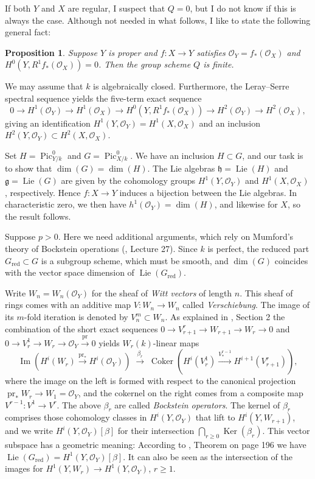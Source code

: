 \documentclass[oneside, 12pt]{amsart}
\newcommand\mylabel[1]{\label{#1}\marginpar{\vspace{-1ex}\medskip\medskip\footnotesize \tt #1}}
\renewcommand\mylabel[1]{\label{#1}}
\newtheorem{proposition}[theorem]{Proposition}
\theoremstyle{definition}
\theoremstyle{remark}
\newcommand{\Cokernel}{\operatorname{Coker}}
\newcommand{\Image}{\operatorname{Im}}
\newcommand{\Kernel}{\operatorname{Ker}}
\newcommand{\Lie}{\operatorname{Lie}}
\newcommand{\lra}{\longrightarrow}
\renewcommand{\O}{\mathscr{O}}
\newcommand{\Pic}{\operatorname{Pic}}
\newcommand{\pr}{\operatorname{pr}}
\newcommand{\ra}{\rightarrow}
\newcommand{\red}{{\operatorname{red}}}
\newcommand{\lieg}{\mathfrak{g}}
\newcommand{\lieh}{\mathfrak{h}}
\begin{document}
\medskip
If both $Y$ and $X$ are regular, I suspect that $Q=0$, but I do not know if this is always the case.
Although not needed in what follows, I like to state the following general fact:

\begin{proposition}
\mylabel{proper monomorphism}
Suppose $Y$ is proper and  $f:X\ra Y$ satisfies $\O_Y=f_*(\O_X)$ and $H^0(Y,R^1f_*(\O_X))=0$. Then  the group scheme  $Q$ is finite.
\end{proposition}

\proof
We may assume that $k$ is algebraically closed. Furthermore, the 
Leray--Serre spectral sequence yields the five-term exact sequence
\begin{equation}
\label{five term sequence}
0\ra H^1(\O_Y)\ra H^1(\O_X)\ra H^0(Y,R^1f_*(\O_X))\ra H^2(\O_Y)\ra H^2(\O_X),
\end{equation}
giving an identification $H^1(Y,\O_Y)=H^1(X,\O_X)$ and an inclusion $H^2(Y,\O_Y)\subset H^2(X,\O_X)$. 

Set $H=\Pic^0_{Y/k}$ and $G=\Pic^0_{X/k}$. We have an inclusion $H\subset G$, and our task is to show that $\dim(G)=\dim(H)$.
The  Lie algebras $\lieh=\Lie(H)$ and $\lieg=\Lie(G)$ are given by the   cohomology groups $H^1(Y,\O_Y)$ and $H^1(X,\O_X)$, respectively.
Hence $f:X\ra Y$ induces a bijection between the Lie algebras.
In characteristic zero,    we then have $h^1(\O_Y)=\dim(H)$, and likewise for $X$, so the result follows.

Suppose   $p>0$. Here we need additional arguments, which rely on  Mumford's  theory of Bockstein operations (\cite{Mumford 1966}, Lecture 27).
Since $k$ is perfect,  the reduced part  $G_\red\subset G$
is a  subgroup scheme, which must be smooth, and $\dim(G)$ coincides with the vector space dimension of $\Lie(G_\red)$.
   
Write $W_n=W_n(\O_Y)$ for the sheaf of \emph{Witt vectors} of length $n$. This sheaf of rings comes with
an additive map $V:W_n\ra W_n$ called \emph{Verschiebung}. The image of its $m$-fold iteration is denoted by  $V_n^m\subset W_n$.
As explained in \cite{Fanelli; Schroeer 2020b}, Section 2 the combination of the short exact sequences
$0\ra V^r_{r+1}\ra W_{r+1}\ra W_r\ra 0$ and $ 0\ra V^1_r\ra W_r\ra \O_Y\stackrel{\pr}{\ra}  0$ yields 
$W_r(k)$-linear maps
\begin{equation}
\label{bockstein}
\Image(H^{i}(W_r)\stackrel{\pr_*}{\ra} H^{i}(\O_Y))\;\stackrel{\beta_r}{\lra} \;\Cokernel(H^{i}(V^1_r)\stackrel{V^{r-1}_*}{\ra} H^{i+1}(V^r_{r+1})),
\end{equation}
where the image on the left is formed with respect to the  canonical projection $\pr_*W_r\ra W_1=\O_Y$,
and the cokernel on the right comes from  a     composite map $V^{r-1}:V^1\ra V^r$.
The above $\beta_r$ are called \emph{Bockstein operators}. The kernel of $\beta_r$ comprises those cohomology classes in $H^i(Y,\O_Y)$
that lift to $H^i(Y, W_{r+1})$, and we write $H^i(Y,\O_Y)[\beta]$ for their intersection $\bigcap_{r\geq 0}\Kernel(\beta_r)$.
This vector subspace has a  geometric meaning:
According to \cite{Mumford 1966}, Theorem on page 196 we have  $\Lie(G_\red)= H^1(Y,\O_Y)[\beta]$. 
It can also be seen as the intersection of the images for $H^1(Y,W_r)\ra H^1(Y,\O_Y)$, $r\geq 1$.
\end{document}
